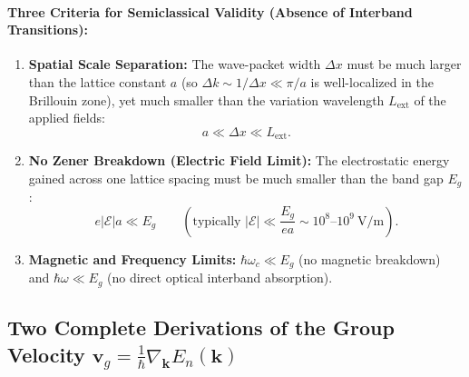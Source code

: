\documentclass[11pt,a4paper]{article}
\newcommand{\abs}[1]{\left|#1\right|}
\newcommand{\vb}[1]{\mathbf{#1}}
\newcommand{\hb}{\hbar}
\newcommand{\kk}{\mathbf{k}}
\begin{document}
\paragraph{Three Criteria for Semiclassical Validity (Absence of Interband Transitions):}
\begin{enumerate}
    \item \textbf{Spatial Scale Separation:} The wave-packet width $\Delta x$ must be much larger than the lattice constant $a$ (so $\Delta k \sim 1/\Delta x \ll \pi/a$ is well-localized in the Brillouin zone), yet much smaller than the variation wavelength $L_{\mathrm{ext}}$ of the applied fields:
    \begin{equation}
        a \ll \Delta x \ll L_{\mathrm{ext}}.
    \end{equation}
    \item \textbf{No Zener Breakdown (Electric Field Limit):} The electrostatic energy gained across one lattice spacing must be much smaller than the band gap $E_g$:
    \begin{equation}
        e\abs{\bm{\mathcal{E}}}a \ll E_g \qquad \left(\text{typically } \abs{\bm{\mathcal{E}}} \ll \frac{E_g}{ea} \sim 10^8\text{--}10^9\ \mathrm{V/m}\right).
    \end{equation}
    \item \textbf{Magnetic and Frequency Limits:} $\hb\omega_c \ll E_g$ (no magnetic breakdown) and $\hb\omega \ll E_g$ (no direct optical interband absorption).
\end{enumerate}

\subsection{Two Complete Derivations of the Group Velocity \texorpdfstring{$\vb{v}_g = \frac{1}{\hb}\nabla_{\kk}E_n(\kk)$}{v_g = (1/hbar) grad_k E_n(k)}}
\end{document}
